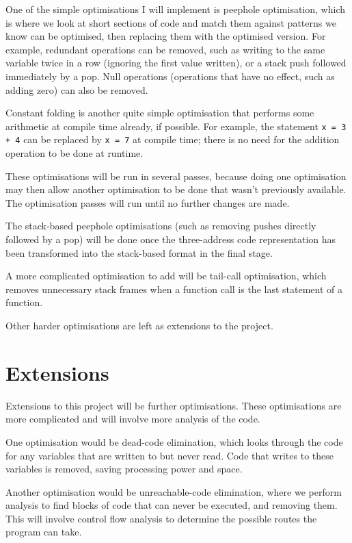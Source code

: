 \documentclass[12pt,a4paper]{article}
\begin{document}
One of the simple optimisations I will implement is peephole optimisation, which is where we look at short sections of code and match them against patterns we know can be optimised, then replacing them with the optimised version.
For example, redundant operations can be removed, such as writing to the same variable twice in a row (ignoring the first value written), or a stack push followed immediately by a pop.
Null operations (operations that have no effect, such as adding zero) can also be removed.

Constant folding is another quite simple optimisation that performs some arithmetic at compile time already, if possible. For example, the statement \texttt{x = 3 + 4} can be replaced by \texttt{x = 7} at compile time; there is no need for the addition operation to be done at runtime.

These optimisations will be run in several passes, because doing one optimisation may then allow another optimisation to be done that wasn't previously available. The optimisation passes will run until no further changes are made.

The stack-based peephole optimisations (such as removing pushes directly followed by a pop) will be done once the three-address code representation has been transformed into the stack-based format in the final stage.

A more complicated optimisation to add will be tail-call optimisation, which removes unnecessary stack frames when a function call is the last statement of a function.

Other harder optimisations are left as extensions to the project.

\section*{Extensions}

Extensions to this project will be further optimisations. These optimisations are more complicated and will involve more analysis of the code.

One optimisation would be dead-code elimination, which looks through the code for any variables that are written to but never read. Code that writes to these variables is removed, saving processing power and space.

Another optimisation would be unreachable-code elimination, where we perform analysis to find blocks of code that can never be executed, and removing them. This will involve control flow analysis to determine the possible routes the program can take.
\end{document}
